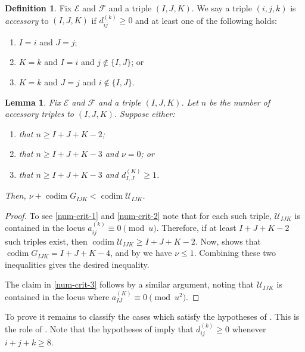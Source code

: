 \documentclass[11pt]{amsart}
\numberwithin{theorem}{section}
\numberwithin{equation}{section}
\newtheorem{lemma}[theorem]{Lemma}
\theoremstyle{definition}\newtheorem{defn}[theorem]{Definition}
\theoremstyle{definition}\newtheorem{remark}[theorem]{Remark}
\theoremstyle{definition}\newtheorem{question}[theorem]{Question}
\theoremstyle{definition}\newtheorem{problem}[theorem]{Problem}
\newcommand{\cE}{\mathcal{E}}
\newcommand{\cF}{\mathcal{F}}
\DeclareMathOperator{\codim}{codim}
\newcommand{\marksing}{\mathcal{U}}
\newcommand{\I}{I}
\newcommand{\J}{J}
\newcommand{\K}{K}
\begin{document}
\begin{defn}
\label{def:acc}
Fix $\cE$ and $\cF$ and a triple $(\I,\J,\K)$. We say a triple $(i,j,k)$ is \emph{accessory} to $(\I,\J,\K)$ if $d_{ij}^{(k)} \geq 0$ and at least one of the following holds:
\begin{enumerate}[label=(\arabic*)]
    \item \label{acc1} $\I = i$ and $\J = j$;
    \item $\label{acc2} \K = k$ and $\I = i$ and $j \notin \{\I,\J\}$; or
    \item \label{acc3} $\K = k$ and $\J = j$ and $i \notin \{\I,\J\}$.
\end{enumerate}
\end{defn}

\begin{lemma}
\label{lem:numerical-criterion}
Fix $\cE$ and $\cF$ and a triple $(\I,\J,\K)$. Let $n$ be the number of accessory triples to $(\I,\J,\K)$. Suppose either:
\begin{enumerate}[label=(\roman*)]
    \item \label{num-crit-1} that $n \geq \I+\J+\K-2$;
    \item \label{num-crit-2} that $n \geq \I+\J+\K-3$ and $\nu = 0$; or
    \item \label{num-crit-3} that $n \geq \I+\J+\K-3$ and $d_{\I,\J}^{(\K)} \geq 1$.
\end{enumerate}
Then, $\nu + \codim G_{\I\J\K} < \codim \marksing_{\I\J\K}$.
\end{lemma}
\begin{proof}
To see \ref{num-crit-1} and \ref{num-crit-2} note that for each such triple, $\marksing_{\I\J\K}$ is contained in the locus $ a^{(k)}_{ij} \equiv 0 \pmod{u}$. Therefore, if at least $\I+\J+\K-2$ such triples exist, then $\codim \marksing_{\I\J\K} \geq \I + \J + \K - 2$. Now,  shows that $\codim G_{\I\J\K} = \I + \J + \K - 4$, and by  we have $\nu \leq 1$. Combining these two inequalities gives the desired inequality.

The claim in \ref{num-crit-3} follows by a similar argument, noting that $\marksing_{\I\J\K}$ is contained in the locus where $ a^{(\K)}_{\I\J} \equiv 0 \pmod{u^2}$.
\end{proof}

To prove  it remains to classify the cases which satisfy the hypotheses of . This is the role of . Note that the hypotheses of  imply that $d_{ij}^{(k)} \geq 0$ whenever $i + j + k \geq 8$. 
\end{document}
